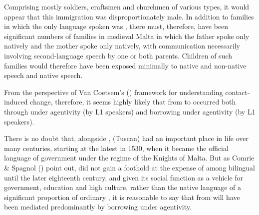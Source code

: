 \documentclass[output=paper]{langsci/langscibook}
\begin{document}
Comprising mostly soldiers, craftsmen and churchmen of various types, it would appear that this immigration was disproportionately male. In addition to families in which the only language spoken was , there must, therefore, have been significant numbers of families in medieval Malta in which the father spoke only  natively and the mother spoke only  natively, with communication necessarily involving second-language speech by one or both parents. Children of such families would therefore have been exposed minimally to native and non-native  speech and native  speech.

From the perspective of Van Coetsem's (\citeyear{VanCoetsem1988,VanCoetsem2000}) framework for understanding contact-induced change, therefore, it seems highly likely that  from  to  occurred both through  under  agentivity (by L1  speakers) and borrowing under  agentivity (by L1  speakers).


There is no doubt that, alongside , (Tuscan)  had an important place in  life over many centuries, starting at the latest in 1530, when it became the official language of government under the regime of the Knights of Malta. But as Comrie \& Spagnol (\citeyear[316]{comriespagnol2016}) point out,  did not gain a foothold at the expense of  among bilingual  until the later eighteenth century, and given its social function as a vehicle for government, education and high culture, rather than the native language of a significant proportion of ordinary , it is reasonable to say that  from  will have been mediated predominantly by borrowing under  agentivity.
\end{document}
